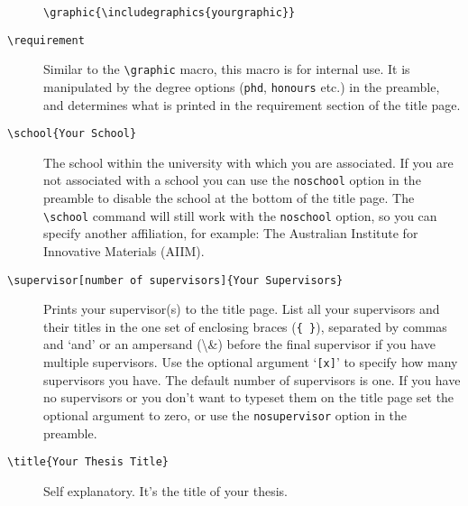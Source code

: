 \documentclass[12pt,oneside]{article}
\newcommand{\option}[1]{\texttt{\color{Green}#1}} %
\newcommand{\command}[1]{\texttt{\color{Red}#1}} %
\newcommand{\comoptions}[1]{\texttt{\color{Blue}#1}} %
\begin{document}
\begin{description}
    \command{\textbackslash{}graphic}\comoptions{\{\textbackslash{}includegraphics\{yourgraphic\}\}}
    
    \item[\command{\textbackslash{}requirement}] Similar to the \command{\textbackslash{}graphic} macro, this macro is for internal use. It is manipulated by the degree options (\option{phd}, \option{honours} etc.) in the preamble, and determines what is printed in the requirement section of the title page.
    
    \item[\command{\textbackslash{}school}\comoptions{\{Your School\}}] The school within the university with which you are associated. If you are not associated with a school you can use the \option{noschool} option in the preamble to disable the school at the bottom of the title page. The \option{\textbackslash{}school} command will still work with the \option{noschool} option, so you can specify another affiliation, for example: The Australian Institute for Innovative Materials (AIIM).
    
    \item[\command{\textbackslash{}supervisor}\option{[number of supervisors]}\comoptions{\{Your Supervisors\}}] Prints your supervisor(s) to the title page. List all your supervisors and their titles in the one set of enclosing braces (\comoptions{\{ \}}), separated by commas and `and' or an ampersand (\textbackslash{}\&) before the final supervisor if you have multiple supervisors. Use the optional argument `\option{[x]}' to specify how many supervisors you have. The default number of supervisors is one. If you have no supervisors or you don't want to typeset them on the title page set the optional argument to zero, or use the \option{nosupervisor} option in the preamble.
    
    \item[\command{\textbackslash{}title}\comoptions{\{Your Thesis Title\}}] Self explanatory. It's the title of your thesis.
\end{description}
\end{document}
